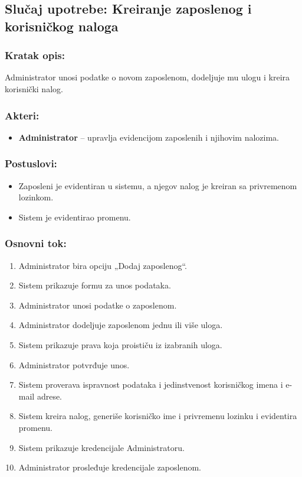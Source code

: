 \subsection{Slučaj upotrebe: Kreiranje zaposlenog i korisničkog naloga}

\subsubsection*{Kratak opis:}

Administrator unosi podatke o novom zaposlenom, dodeljuje mu ulogu i kreira korisnički nalog.

\subsubsection*{Akteri:}
\begin{itemize}
	\item \textbf{Administrator} -- upravlja evidencijom zaposlenih i njihovim nalozima.
\end{itemize}

\subsubsection*{Postuslovi:}
\begin{itemize}
	\item Zaposleni je evidentiran u sistemu, a njegov nalog je kreiran sa privremenom lozinkom.
	\item Sistem je evidentirao promenu.
\end{itemize}

\subsubsection*{Osnovni tok:}
\begin{enumerate}
	\item Administrator bira opciju „Dodaj zaposlenog“.
	\item Sistem prikazuje formu za unos podataka.
	\item Administrator unosi podatke o zaposlenom.
	\item Administrator dodeljuje zaposlenom jednu ili više uloga.
	\item Sistem prikazuje prava koja proističu iz izabranih uloga.
	\item Administrator potvrđuje unos.
	\item Sistem proverava ispravnost podataka i jedinstvenost korisničkog imena i e-mail adrese.
	\item Sistem kreira nalog, generiše korisničko ime i privremenu lozinku i evidentira promenu.
	\item Sistem prikazuje kredencijale Administratoru.
	\item Administrator prosleđuje kredencijale zaposlenom.
\end{enumerate}

